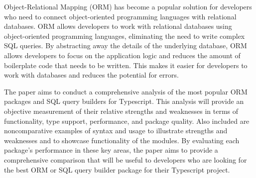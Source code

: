 Object-Relational Mapping (ORM) has become a popular solution for developers who need to connect object-oriented programming languages with relational databases. ORM allows developers to work with relational databases using object-oriented programming languages, eliminating the need to write complex SQL queries. By abstracting away the details of the underlying database, ORM allows developers to focus on the application logic and reduces the amount of boilerplate code that needs to be written. This makes it easier for developers to work with databases and reduces the potential for errors. \par
The paper aims to conduct a comprehensive analysis of the most popular ORM packages and SQL query builders for Typescript. This analysis will provide an objective measurement of their relative strengths and weaknesses in terms of functionality, type support, performance, and package quality. Also included are noncomparative examples of syntax and usage to illustrate strengths and weaknesses and to showcase functionality of the modules. By evaluating each package's performance in these key areas, the paper aims to provide a comprehensive comparison that will be useful to developers who are looking for the best ORM or SQL query builder package for their Typescript project.\par
